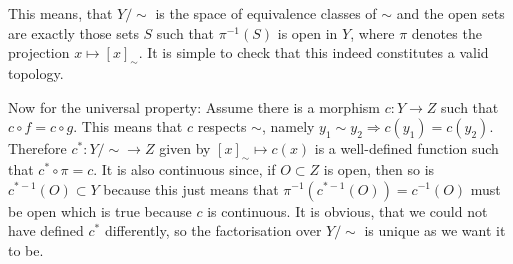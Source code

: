 \documentclass{scrartcl}
\begin{document}
    This means, that $Y/{\sim}$ is the space of equivalence classes of $\sim$ and the open sets are exactly those sets $S$ such that $π^{-1}(S)$ is open in $Y$, where $π$ denotes the projection $x \mapsto [x]_{\sim}$. It is simple to check that this indeed constitutes a valid topology.
    
    Now for the universal property: Assume there is a morphism $c : Y → Z$ such that $c \circ f = c \circ g$. This means that $c$ respects $\sim$, namely $y_1 \sim y_2 ⇒ c(y_1) = c(y_2)$. Therefore $c^{*} : Y/{\sim} → Z$ given by $[x]_\sim \mapsto c(x)$ is a well-defined function such that $c^{*} \circ π = c$. It is also continuous since, if $O ⊂ Z$ is open, then so is $c^{*-1}(O) ⊂ Y$ because this just means that $π^{-1}(c^{*-1}(O)) = c^{-1}(O)$ must be open which is true because $c$ is continuous. It is obvious, that we could not have defined $c^{*}$ differently, so the factorisation over $Y/{\sim}$ is unique as we want it to be.
\end{document}
